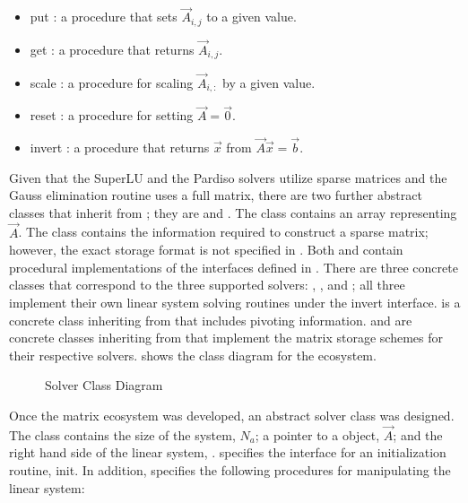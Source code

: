 \begin{itemize}
\item{put : a procedure that sets $\vec{A}_{i,j}$ to a given value.}
\item{get : a procedure that returns $\vec{A}_{i,j}$.}
\item{scale : a procedure for scaling $\vec{A}_{i, :}$ by a given value.}
\item{reset : a procedure for setting $\vec{A} = \vec{0}$.}
\item{invert : a procedure that returns $\vec{x}$ from $\vec{A}\vec{x} = \vec{b}$.}
\end{itemize}

Given that the SuperLU and the Pardiso solvers utilize sparse matrices and the Gauss elimination routine uses a full matrix, there are two further abstract classes that inherit from ; they are  and .
The  class contains an array representing $\vec{A}$.
The  class contains the information required to construct a sparse matrix; however, the exact storage format is not specified in .
Both  and  contain procedural implementations of the interfaces defined in .
There are three concrete classes that correspond to the three supported solvers: , , and ; all three implement their own linear system solving routines under the invert interface.
 is a concrete class inheriting from  that includes pivoting information.
 and  are concrete classes inheriting from  that implement the matrix storage schemes for their respective solvers.
 shows the class diagram for the  ecosystem.

\begin{figure}[h!t]
\singlespace\centering

\caption{Solver Class Diagram}
\label{fig:solverClassDiagram}
\end{figure}

Once the matrix ecosystem was developed, an abstract solver class was designed.
The  class contains the size of the system, $N_{a}$; a pointer to a  object, $\vec{A}$; and the right hand side of the linear system, .
 specifies the interface for an initialization routine, init.
In addition,  specifies the following procedures for manipulating the linear system:

